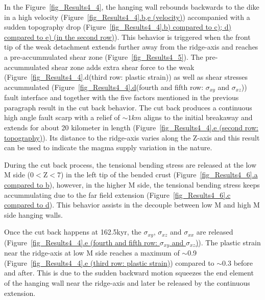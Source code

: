 In the Figure~\hyperref[fig_Results4_4]{\ref{fig_Results4_4}}, the hanging wall rebounds backwards to the dike in a high velocity (Figure~\hyperref[fig_Results4_4]{\ref{fig_Results4_4}.b,e (velocity)}) accompanied with a sudden topography drop (Figure~\hyperref[fig_Results4_4]{\ref{fig_Results4_4}.b) compared to c); d) compared to e) (in the second row)}). This behavior is triggered when the front tip of the weak detachment extends further away from the ridge-axis and reaches a pre-accummulated shear zone (Figure~\hyperref[fig_Results4_5]{\ref{fig_Results4_5}}). The pre-accummulated shear zone adds extra shear force to the weak (Figure~\hyperref[fig_Results4_4]{\ref{fig_Results4_4}}.d(third row: plastic strain)) as well as shear stresses accummulated (Figure~\hyperref[fig_Results4_4]{\ref{fig_Results4_4}.d}(fourth and fifth row: $\sigma_{xy}$ and $\sigma_{xz}$)) fault interface and together with the five factors mentioned in the previous paragraph result in the cut back behavior. The cut back produces a continuous high angle fault scarp with a relief of $\sim 1km$ aligns to the initial breakaway and extends for about 20 kilometer in length (Figure~\hyperref[fig_Results4_4]{\ref{fig_Results4_4}.e (second row: topography)}). Its distance to the ridge-axis varies along the Z-axis and this result can be used to indicate the magma supply variation in the nature. 

During the cut back process, the tensional bending stress are released at the low M side ($0<$Z$<7$) in the left tip of the bended crust (Figure~\hyperref[fig_Results4_6]{\ref{fig_Results4_6}.a compared to b}), however, in the higher M side, the tensional bending stress keeps accummulating due to the far field extension (Figure~\hyperref[fig_Results4_6]{\ref{fig_Results4_6}.c compared to d}). This behavior assists in the decouple between low M and high M side hanging walls. 

Once the cut back happens at 162.5kyr, the $\sigma_{xy}$, $\sigma_{xz}$ and $\sigma_{xx}$ are released (Figure~\hyperref[fig_Results4_4]{\ref{fig_Results4_4}.e (fourth and fifth row: $\sigma_{xy}$ and $\sigma_{xz}$)}). The plastic strain near the ridge-axis at low M side reaches a maximum of $\sim$0.9 (Figure~\hyperref[fig_Results4_4]{\ref{fig_Results4_4}.e (third row: plastic strain)}) compared to $\sim$0.3 before and after. This is due to the sudden backward motion squeezes the end element of the hanging wall near the ridge-axis and later be released by the continuous extension.

